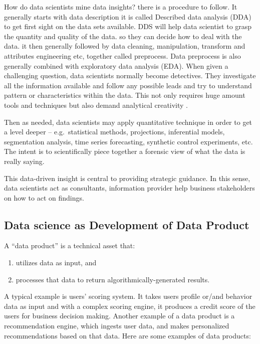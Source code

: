 \documentclass[
]{book}
\providecommand{\tightlist}{%
  \setlength{\itemsep}{0pt}\setlength{\parskip}{0pt}}
\begin{document}
How do data scientists mine data insights? there is a procedure to follow. It generally starts with data description it is called Described data analysis (DDA) to get first sight on the data sets available. DDS will help data scientist to grasp the quantity and quality of the data. so they can decide how to deal with the data. it then generally followed by data cleaning, manipulation, transform and attributes engineering etc, together called preprocess. Data preprocess is also generally combined with exploratory data analysis (EDA). When given a challenging question, data scientists normally become detectives. They investigate all the information available and follow any possible leads and try to understand pattern or characteristics within the data. This not only requires huge amount tools and techniques but also demand analytical creativity .

Then as needed, data scientists may apply quantitative technique in order to get a level deeper -- e.g.~statistical methods, projections, inferential models, segmentation analysis, time series forecasting, synthetic control experiments, etc. The intent is to scientifically piece together a forensic view of what the data is really saying.

This data-driven insight is central to providing strategic guidance. In this sense, data scientists act as consultants, information provider help business stakeholders on how to act on findings.

\hypertarget{data-science-as-development-of-data-product}{%
\subsection{Data science as Development of Data Product}\label{data-science-as-development-of-data-product}}

A ``data product'' is a technical asset that:

\begin{enumerate}
\def\labelenumi{\arabic{enumi}.}
\tightlist
\item
  utilizes data as input, and
\item
  processes that data to return algorithmically-generated results.
\end{enumerate}

A typical example is users' scoring system. It takes users profile or/and behavior data as input and with a complex scoring engine, it produces a credit score of the users for business decision making.
Another example of a data product is a recommendation engine, which ingests user data, and makes personalized recommendations based on that data.
Here are some examples of data products:
\end{document}
